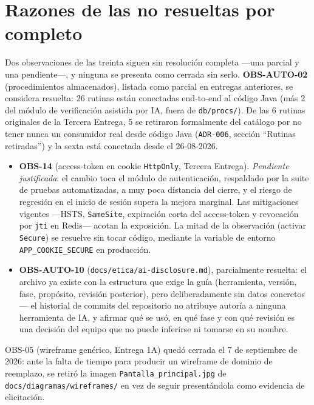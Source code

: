 \section*{Razones de las no resueltas por completo}

Dos observaciones de las treinta siguen sin resolución completa ---una
parcial y una pendiente---, y ninguna se presenta como cerrada sin serlo.
\textbf{OBS-AUTO-02} (procedimientos almacenados),
listada como parcial en entregas anteriores, se considera resuelta: 26
rutinas están conectadas end-to-end al código Java (más 2 del módulo de
verificación asistida por IA, fuera de \texttt{db/procs/}). De las 6
rutinas originales de la Tercera Entrega, 5 se retiraron formalmente del
catálogo por no tener nunca un consumidor real desde código Java
(\texttt{ADR-006}, sección ``Rutinas retiradas'') y la sexta está
conectada desde el 26-08-2026.

\begin{itemize}
  \item \textbf{OBS-14} (access-token en cookie \texttt{HttpOnly}, Tercera
    Entrega). \emph{Pendiente justificada}: el cambio toca el módulo de
    autenticación, respaldado por la suite de pruebas automatizadas, a muy
    poca distancia del cierre,
    y el riesgo de regresión en el inicio de sesión supera la mejora marginal.
    Las mitigaciones vigentes ---HSTS, \texttt{SameSite}, expiración corta del
    access-token y revocación por \texttt{jti} en Redis--- acotan la
    exposición. La mitad de la observación (activar \texttt{Secure}) se
    resuelve sin tocar código, mediante la variable de entorno
    \texttt{APP\_COOKIE\_SECURE} en producción.
  \item \textbf{OBS-AUTO-10} (\texttt{docs/etica/ai-disclosure.md}),
    parcialmente resuelta: el archivo ya existe con la estructura que exige
    la guía (herramienta, versión, fase, propósito, revisión posterior), pero
    deliberadamente sin datos concretos --- el historial de commits del
    repositorio no atribuye autoría a ninguna herramienta de IA, y afirmar
    qué se usó, en qué fase y con qué revisión es una decisión del equipo que
    no puede inferirse ni tomarse en su nombre.
\end{itemize}

OBS-05 (wireframe genérico, Entrega 1A) quedó cerrada el 7 de septiembre de
2026: ante la falta de tiempo para producir un wireframe de dominio de
reemplazo, se retiró la imagen \texttt{Pantalla\_principal.jpg} de
\texttt{docs/diagramas/wireframes/} en vez de seguir presentándola como
evidencia de elicitación.

